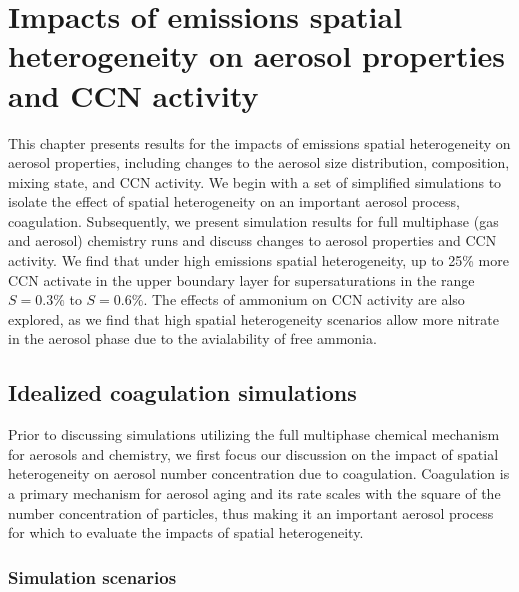 \chapter{Impacts of emissions spatial heterogeneity on aerosol properties and CCN activity}

This chapter presents results for the impacts of emissions spatial heterogeneity on aerosol properties, including changes to the aerosol size distribution, composition, mixing state, and CCN activity. We begin with a set of simplified simulations to isolate the effect of spatial heterogeneity on an important aerosol process, coagulation. Subsequently, we present simulation results for full multiphase (gas and aerosol) chemistry runs and discuss changes to aerosol properties and CCN activity. We find that under high emissions spatial heterogeneity, up to 25\% more CCN activate in the upper boundary layer for supersaturations in the range $S=0.3\%$ to $S=0.6\%$. The effects of ammonium on CCN activity are also explored, as we find that high spatial heterogeneity scenarios allow more nitrate in the aerosol phase due to the avialability of free ammonia.
\section{Idealized coagulation simulations}

Prior to discussing simulations utilizing the full multiphase chemical mechanism for aerosols and chemistry, we first focus our discussion on the impact of spatial heterogeneity on aerosol number concentration due to coagulation. Coagulation is a primary mechanism for aerosol aging and its rate scales with the square of the number concentration of particles, thus making it an important aerosol process for which to evaluate the impacts of spatial heterogeneity. 

\subsection{Simulation scenarios}

